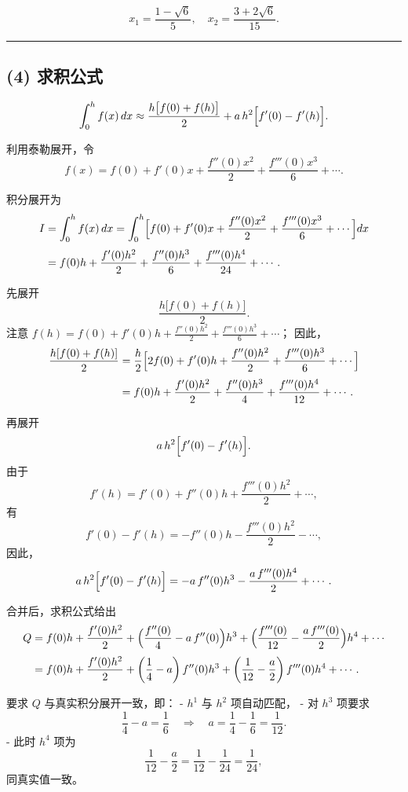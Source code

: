 \documentclass[11pt]{article}
\begin{document}
\[\boxed{
x_1=\dfrac{1-\sqrt{6}}{5},\quad x_2=\dfrac{3+2\sqrt{6}}{15}.}
\]

\begin{center}\rule{0.5\linewidth}{0.5pt}\end{center}

\subsection{(4) 求积公式}\label{ux6c42ux79efux516cux5f0f-2}

\[
\int_{0}^{h} f(x)\,dx \approx \frac{h\bigl[f(0)+f(h)\bigr]}{2} + a\,h^2\Bigl[f'(0)-f'(h)\Bigr].
\]

利用泰勒展开，令 \[
f(x)=f(0)+f'(0)x+\frac{f''(0)x^2}{2}+\frac{f'''(0)x^3}{6}+\cdots.
\]

积分展开为 \[
\begin{aligned}
I &=\int_{0}^{h} f(x)\,dx
=\int_{0}^{h}\Bigl[f(0)+f'(0)x+\frac{f''(0)x^2}{2}+\frac{f'''(0)x^3}{6}+\cdots\Bigr]dx\\[1mm]
&=f(0)h+\frac{f'(0)h^2}{2}+\frac{f''(0)h^3}{6}+\frac{f'''(0)h^4}{24}+\cdots.
\end{aligned}
\]

先展开 \[
\frac{h\bigl[f(0)+f(h)\bigr]}{2}.
\] 注意
\(f(h)=f(0)+f'(0)h+\frac{f''(0)h^2}{2}+\frac{f'''(0)h^3}{6}+\cdots\)；
因此， \[
\begin{aligned}
\frac{h[f(0)+f(h)]}{2} &=\frac{h}{2}\Bigl[2f(0)+f'(0)h+\frac{f''(0)h^2}{2}+\frac{f'''(0)h^3}{6}+\cdots\Bigr]\\[1mm]
&= f(0)h+\frac{f'(0)h^2}{2}+\frac{f''(0)h^3}{4}+\frac{f'''(0)h^4}{12}+\cdots.
\end{aligned}
\]

再展开 \[
a\,h^2\Bigl[f'(0)-f'(h)\Bigr].
\] 由于 \[
f'(h)=f'(0)+f''(0)h+\frac{f'''(0)h^2}{2}+\cdots,
\] 有 \[
f'(0)-f'(h)=-f''(0)h-\frac{f'''(0)h^2}{2}-\cdots,
\] 因此， \[
a\,h^2\Bigl[f'(0)-f'(h)\Bigr]=-a\,f''(0)h^3-\frac{a\,f'''(0)h^4}{2}+\cdots.
\]

合并后，求积公式给出 \[
\begin{aligned}
Q &= f(0)h+\frac{f'(0)h^2}{2}+\Bigl(\frac{f''(0)}{4}-a\,f''(0)\Bigr)h^3
+\Bigl(\frac{f'''(0)}{12}-\frac{a\,f'''(0)}{2}\Bigr)h^4+\cdots\\[1mm]
&= f(0)h+\frac{f'(0)h^2}{2} + \left(\frac{1}{4}-a\right)f''(0)h^3
+\left(\frac{1}{12}-\frac{a}{2}\right)f'''(0)h^4+\cdots.
\end{aligned}
\]

要求 \(Q\) 与真实积分展开一致，即： - \(h^1\) 与 \(h^2\) 项自动匹配， -
对 \(h^3\) 项要求 \[
  \frac{1}{4}-a=\frac{1}{6}\quad\Longrightarrow\quad a=\frac{1}{4}-\frac{1}{6}=\frac{1}{12}.
  \] - 此时 \(h^4\) 项为 \[
  \frac{1}{12}-\frac{a}{2} = \frac{1}{12}-\frac{1}{24}=\frac{1}{24},
  \] 同真实值一致。
\end{document}

